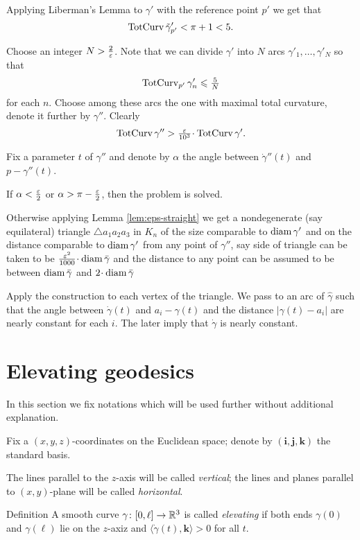 \documentclass[a4paper,10pt]{amsart}
\begin{document}
Applying Liberman's Lemma to $\gamma'$ with  the reference point $p'$ 
we get that 
\[\mathop{\rm TotCurv}\nolimits\tilde\gamma'_{p'}<\pi+1<5.\]

Choose an integer $N>\tfrac2{\varepsilon}$.
Note that we can divide $\gamma'$ into $N$ arcs 
$\gamma'_1,\dots,\gamma'_N$
so that 
\[\mathop{\rm TotCurv}\nolimits_{p'}\gamma_n'\leqslant \tfrac{5}{N}\]
for each $n$.
Choose among these arcs the one with maximal total curvature,
denote it further by $\gamma''$.
Clearly 
\[\tc\gamma''>\tfrac\eps{10^3}\cdot \tc\gamma'.\]

Fix a parameter $t$ of $\gamma''$
and denote by $\alpha$ the angle between $\dot\gamma''(t)$ and $p-\gamma''(t)$.

If $\alpha<\tfrac{\varepsilon}2$ or $\alpha>\pi-\tfrac{\varepsilon}2$,
then the problem is solved.

Otherwise 
applying Lemma \ref{lem:eps-straight} we get a nondegenerate (say equilateral) 
triangle $\triangle a_1a_2a_3$ in $K_n$ 
of the size comparable to $\operatorname{diam} \gamma'$ 
and on the distance comparable to $\operatorname{diam} \gamma'$ from any point of $\gamma''$,
say side of triangle can be taken to be $\tfrac{\eps^2}{1000}\cdot\diam \bar\gamma$
and the distance to any point can be assumed to be between $\operatorname{diam} \bar\gamma$ and $2\cdot \diam \bar\gamma$

Apply the construction to each vertex of the triangle.
We pass to an arc of $\hat\gamma$
such that the angle between $\dot\gamma(t)$ and $a_i-\gamma(t)$ 
and the distance $|\gamma(t)-a_i|$
are nearly constant for each $i$.
The later imply that $\dot\gamma$ is nearly constant.
\qeds





\section{Elevating geodesics}\label{sec:elevating}

In this section we fix notations which will be used further 
without additional explanation.

Fix a $(x,y,z)$-coordinates on the Euclidean space;
denote by $(\bm{i},\bm{j},\bm{k})$
the standard basis.

The lines parallel to the $z$-axis will be called \emph{vertical};
the lines and planes parallel to $(x,y)$-plane will be called \emph{horizontal}.

\begin{thm}{Definition}
A smooth curve $\gamma\colon[0,\ell]\to\mathbb{R}^3$ 
is called \emph{elevating} if both ends $\gamma(0)$ and $\gamma(\ell)$ lie on the $z$-axiz and $\langle\dot\gamma(t),\bm{k}\rangle>0$ for all $t$.
\end{thm}
\end{document}
